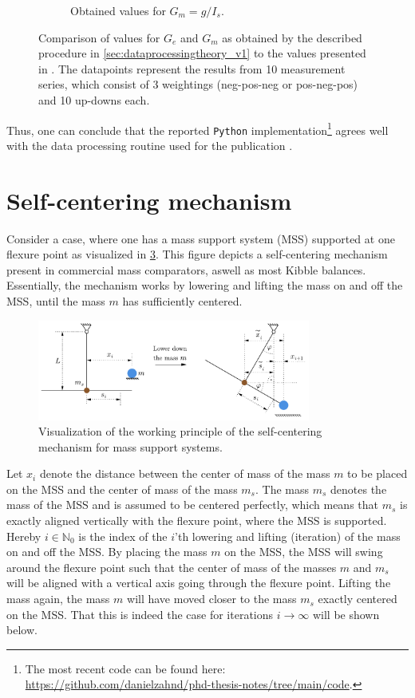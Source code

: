\documentclass{report}
\numberwithin{tm}{section}
\begin{document}
\begin{figure}[h]
\begin{subfigure}{0.49\textwidth}
		\caption{Obtained values for $G_m =g/I_s$.}
		\label{fig:example_g_i}
	\end{subfigure}
	\caption{Comparison of values for $G_e$ and $G_m$ as obtained by the described procedure in \cref{sec:dataprocessingtheory_v1} to the values presented in \cite{Eichenberger_2022}. The datapoints represent the results from 10 measurement series, which consist of 3 weightings (neg-pos-neg or pos-neg-pos) and 10 up-downs each.}
\end{figure}
Thus, one can conclude that the reported \verb|Python| implementation\footnote{The most recent code can be found here: \url{https://github.com/danielzahnd/phd-thesis-notes/tree/main/code}.} agrees well with the data processing routine used for the publication \cite{Eichenberger_2022}.

\FloatBarrier

\section{Self-centering mechanism}
Consider a case, where one has a mass support system (MSS) supported at one flexure point as visualized in \cref{fig:selfcentering}. This figure depicts a self-centering mechanism present in commercial mass comparators, aswell as most Kibble balances. Essentially, the mechanism works by lowering and lifting the mass on and off the MSS, until the mass $m$ has sufficiently centered.
\begin{figure}[h]
	\centering
	 \includegraphics[width=0.8\textwidth]{figures/selfcentering.pdf}
	 \caption{Visualization of the working principle of the self-centering mechanism for mass support systems.}
	 \label{fig:selfcentering}
\end{figure}

Let $x_i$ denote the distance between the center of mass of the mass $m$ to be placed on the MSS and the center of mass of the mass $m_s$. The mass $m_s$ denotes the mass of the MSS and is assumed to be centered perfectly, which means that $m_s$ is exactly aligned vertically with the flexure point, where the MSS is supported. Hereby $i \in \mathbb{N}_0$ is the index of the $i$'th lowering and lifting (iteration) of the mass on and off the MSS. By placing the mass $m$ on the MSS, the MSS will swing around the flexure point such that the center of mass of the masses $m$ and $m_s$ will be aligned with a vertical axis going through the flexure point. Lifting the mass again, the mass $m$ will have moved closer to the mass $m_s$ exactly centered on the MSS. That this is indeed the case for iterations $i \rightarrow \infty$ will be shown below.
\end{document}
